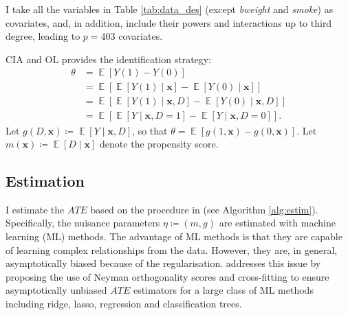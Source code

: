 \documentclass[a4paper,12pt]{article}
\DeclareMathOperator*{\E}{\mathbb{E}}
\newcommand{\Eb}[1]{\E\left[#1\right]}
\newcommand{\ceq}{\coloneqq}  %
\begin{document}
I take all the variables in Table \ref{tab:data_des} (except \textit{bweight} and \textit{smoke}) as covariates, and, in addition, include their powers and interactions up to third degree, leading to $p=403$ covariates.

\noindent CIA and OL provides the identification strategy:
\begin{align*}
\theta &= \Eb{Y(1)-Y(0)} \\
	&= \Eb{\Eb{Y(1)\mid \bm{x}}-\Eb{Y(0)\mid \bm{x}}}  \\
	&=\Eb{\Eb{Y(1)\mid \bm{x}, D}-\Eb{Y(0)\mid \bm{x}, D}}  \\
	&=\Eb{\Eb{Y\mid \bm{x}, D=1}-\Eb{Y\mid \bm{x}, D=0}}.
\end{align*}
Let $g(D, \bm{x})\ceq\Eb{Y\mid \bm{x}, D}$, so that $\theta=\Eb{g(1, \bm{x})-g( 0, \bm{x})}$. Let $m(\bm{x})\ceq \Eb{D\mid\bm{x}}$ denote the propensity score.

\subsection{Estimation}

I estimate the $ATE$ based on the procedure in \cite{chernozhukov2016} (see Algorithm \ref{alg:estim}). Specifically, the nuisance parameters $\eta\ceq (m, g)$ are estimated with machine learning (ML) methods. The advantage of ML methods is that they are capable of learning complex relationships from the data. However, they are, in general, asymptotically biased because of the regularisation.  \cite{chernozhukov2016} addresses this issue by proposing the use of Neyman orthogonality scores and cross-fitting to ensure asymptotically unbiased $ATE$ estimators for a large class of ML methods including ridge, lasso, regression and classification trees.
\end{document}
